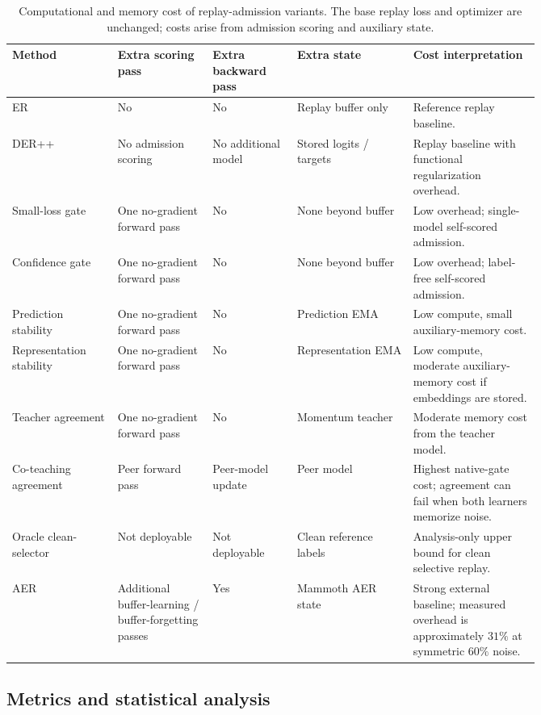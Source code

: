 \documentclass[preprint,12pt]{elsarticle}
\begin{document}
\begin{table}[H]
\centering
\caption{Computational and memory cost of replay-admission variants. The base replay loss and optimizer are unchanged; costs arise from admission scoring and auxiliary state.}
\label{tab}
\scriptsize
\setlength{\tabcolsep}{3pt}
\renewcommand{\arraystretch}{1.08}
\begin{tabularx}{\linewidth}{@{}p{0.20\linewidth}p{0.18\linewidth}p{0.16\linewidth}p{0.22\linewidth}Y@{}}
\toprule
Method & Extra scoring pass & Extra backward pass & Extra state & Cost interpretation \\
\midrule
ER & No & No & Replay buffer only & Reference replay baseline. \\
DER++ & No admission scoring & No additional model & Stored logits / targets & Replay baseline with functional regularization overhead. \\
Small-loss gate & One no-gradient forward pass & No & None beyond buffer & Low overhead; single-model self-scored admission. \\
Confidence gate & One no-gradient forward pass & No & None beyond buffer & Low overhead; label-free self-scored admission. \\
Prediction stability & One no-gradient forward pass & No & Prediction EMA & Low compute, small auxiliary-memory cost. \\
Representation stability & One no-gradient forward pass & No & Representation EMA & Low compute, moderate auxiliary-memory cost if embeddings are stored. \\
Teacher agreement & One no-gradient forward pass & No & Momentum teacher & Moderate memory cost from the teacher model. \\
Co-teaching agreement & Peer forward pass & Peer-model update & Peer model & Highest native-gate cost; agreement can fail when both learners memorize noise. \\
Oracle clean-selector & Not deployable & Not deployable & Clean reference labels & Analysis-only upper bound for clean selective replay. \\
AER & Additional buffer-learning / buffer-forgetting passes & Yes & Mammoth AER state & Strong external baseline; measured overhead is approximately $31\%$ at symmetric $60\%$ noise. \\
\bottomrule
\end{tabularx}
\end{table}

\subsection{Metrics and statistical analysis}
\end{document}
